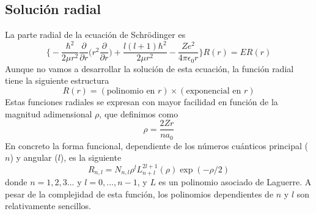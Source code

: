 \documentclass{tufte-handout}
\begin{document}
\subsection{Solución radial}
La parte radial de la ecuación de Schrödinger es
\begin{equation}
    \bigg\{-\frac{\hbar^2}{2\mu r^2}\frac{\partial}{\partial r}\bigg(r^2\frac{\partial}{\partial r}\bigg) 
    +  \frac{l(l+1)\hbar^2}{2\mu r^2}
    - \frac{Ze^2}{4\pi \epsilon_0r}  \bigg\}
    R(r)
    = ER(r)
\end{equation}
Aunque no vamos a desarrollar la solución de esta ecuación, la función
radial tiene la siguiente estructura
\begin{equation}
    R(r)=(\textrm{polinomio en }r)\times(\textrm{exponencial en }r)
\end{equation}
Estas funciones radiales se expresan con mayor facilidad 
en función de la magnitud adimensional $\rho$, que definimos como
\begin{equation}
    \rho = \frac{2Zr}{na_0}
\end{equation}
En concreto la forma funcional, dependiente de los números
cuánticos principal ($n$) y angular ($l$), es la siguiente
\begin{equation}
  R_{n,l} = N_{n,l}\rho^l L^{2l+1}_{n+l}(\rho)\exp(-\rho/2)
\end{equation}
donde $n=1,2,3...$ y $l=0,...,n-1$, y $L$ es un polinomio
asociado de Laguerre. A pesar de la complejidad de esta función,
los polinomios dependientes de $n$ y $l$ son relativamente
sencillos. 
\end{document}
